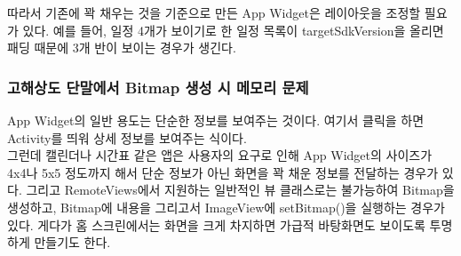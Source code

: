 따라서 기존에 꽉 채우는 것을 기준으로 만든 App Widget은 레이아웃을 조정할 필요가 있다. 예를 들어, 일정 4개가 보이기로 한 일정 목록이 targetSdkVersion을 올리면 패딩 때문에 3개 반이 보이는 경우가 생긴다.

\subsubsection{고해상도 단말에서 Bitmap 생성 시 메모리 문제}
App Widget의 일반 용도는 단순한 정보를 보여주는 것이다. 여기서 클릭을 하면 Activity를 띄워 상세 정보를 보여주는 식이다.\\

그런데 캘린더나 시간표 같은 앱은 사용자의 요구로 인해 App Widget의 사이즈가 4x4나 5x5 정도까지 해서 단순 정보가 아닌 화면을 꽉 채운 정보를 전달하는 경우가 있다.
그리고 RemoteViews에서 지원하는 일반적인 뷰 클래스로는 불가능하여 Bitmap을 생성하고, Bitmap에 내용을 그리고서 ImageView에 setBitmap()을 실행하는 경우가 있다.
게다가 홈 스크린에서는 화면을 크게 차지하면 가급적 바탕화면도 보이도록 투명하게 만들기도 한다.\\

